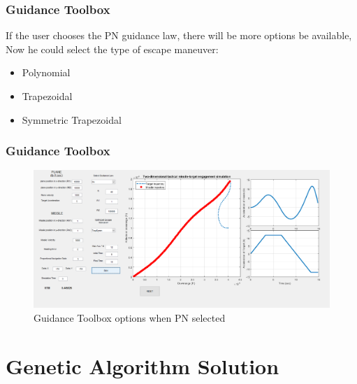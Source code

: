 \documentclass{beamer}
\begin{document}
\begin{frame}
\frametitle{Guidance Toolbox}
If the user chooses the PN guidance law, there will be more options be available, Now he could select the type of escape maneuver:
\begin{itemize}
\item Polynomial
\item Trapezoidal
\item Symmetric Trapezoidal
\end{itemize}
\end{frame}
\begin{frame}
\frametitle{Guidance Toolbox}
\begin{figure}[H]
\centering
\includegraphics[scale = 0.3]{fig/guiPN.PNG}
\caption{Guidance Toolbox options when PN selected}
\label{Guidance Toolbox PN}
\end{figure}
\end{frame}

\section{Genetic Algorithm Solution}
\subsection{}
\end{document}
